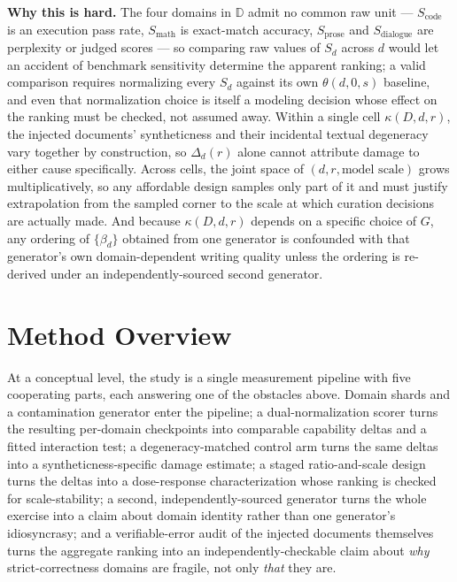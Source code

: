 \documentclass[11pt]{article}
\begin{document}
\noindent\textbf{Why this is hard.} The four domains in $\mathbb{D}$ admit no common raw unit --- $S_{\text{code}}$ is an execution pass rate, $S_{\text{math}}$ is exact-match accuracy, $S_{\text{prose}}$ and $S_{\text{dialogue}}$ are perplexity or judged scores --- so comparing raw values of $S_d$ across $d$ would let an accident of benchmark sensitivity determine the apparent ranking; a valid comparison requires normalizing every $S_d$ against its own $\theta(d,0,s)$ baseline, and even that normalization choice is itself a modeling decision whose effect on the ranking must be checked, not assumed away. Within a single cell $\kappa(D,d,r)$, the injected documents' syntheticness and their incidental textual degeneracy vary together by construction, so $\Delta_d(r)$ alone cannot attribute damage to either cause specifically. Across cells, the joint space of $(d, r, \text{model scale})$ grows multiplicatively, so any affordable design samples only part of it and must justify extrapolation from the sampled corner to the scale at which curation decisions are actually made. And because $\kappa(D,d,r)$ depends on a specific choice of $G$, any ordering of $\{\beta_d\}$ obtained from one generator is confounded with that generator's own domain-dependent writing quality unless the ordering is re-derived under an independently-sourced second generator.

\section{Method Overview}

At a conceptual level, the study is a single measurement pipeline with five cooperating parts, each answering one of the obstacles above. Domain shards and a contamination generator enter the pipeline; a dual-normalization scorer turns the resulting per-domain checkpoints into comparable capability deltas and a fitted interaction test; a degeneracy-matched control arm turns the same deltas into a syntheticness-specific damage estimate; a staged ratio-and-scale design turns the deltas into a dose-response characterization whose ranking is checked for scale-stability; a second, independently-sourced generator turns the whole exercise into a claim about domain identity rather than one generator's idiosyncrasy; and a verifiable-error audit of the injected documents themselves turns the aggregate ranking into an independently-checkable claim about \emph{why} strict-correctness domains are fragile, not only \emph{that} they are.
\end{document}
